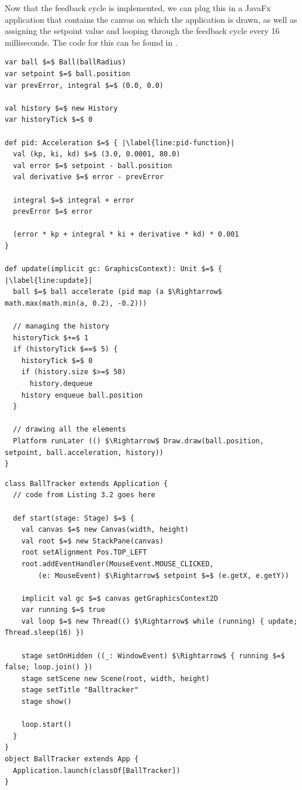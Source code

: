 Now that the feedback cycle is implemented, we can plug this in a JavaFx application that contains the canvas on which the application is drawn, as well as assigning the setpoint value and looping through the feedback cycle every 16 milliseconds. The code for this can be found in .


\begin{minipage}{\linewidth}
\begin{lstlisting}[style=ScalaStyle, caption={Ball drawing}, label={lst:ball-feedback}]
var ball $=$ Ball(ballRadius)
var setpoint $=$ ball.position
var prevError, integral $=$ (0.0, 0.0)

val history $=$ new History
var historyTick $=$ 0

def pid: Acceleration $=$ { |\label{line:pid-function}|
  val (kp, ki, kd) $=$ (3.0, 0.0001, 80.0)
  val error $=$ setpoint - ball.position
  val derivative $=$ error - prevError

  integral $=$ integral + error
  prevError $=$ error

  (error * kp + integral * ki + derivative * kd) * 0.001
}

def update(implicit gc: GraphicsContext): Unit $=$ { |\label{line:update}|
  ball $=$ ball accelerate (pid map (a $\Rightarrow$ math.max(math.min(a, 0.2), -0.2)))

  // managing the history
  historyTick $+=$ 1
  if (historyTick $==$ 5) {
    historyTick $=$ 0
    if (history.size $>=$ 50)
      history.dequeue
    history enqueue ball.position
  }

  // drawing all the elements
  Platform runLater (() $\Rightarrow$ Draw.draw(ball.position, setpoint, ball.acceleration, history))
}
\end{lstlisting}

\begin{lstlisting}[style=ScalaStyle, caption={Ball drawing}, label={lst:ball-drawing}]
class BallTracker extends Application {
  // code from Listing 3.2 goes here

  def start(stage: Stage) $=$ {
    val canvas $=$ new Canvas(width, height)
    val root $=$ new StackPane(canvas)
    root setAlignment Pos.TOP_LEFT
    root.addEventHandler(MouseEvent.MOUSE_CLICKED,
        (e: MouseEvent) $\Rightarrow$ setpoint $=$ (e.getX, e.getY))

    implicit val gc $=$ canvas getGraphicsContext2D
    var running $=$ true
    val loop $=$ new Thread(() $\Rightarrow$ while (running) { update; Thread.sleep(16) })

    stage setOnHidden ((_: WindowEvent) $\Rightarrow$ { running $=$ false; loop.join() })
    stage setScene new Scene(root, width, height)
    stage setTitle "Balltracker"
    stage show()

    loop.start()
  }
}
object BallTracker extends App {
  Application.launch(classOf[BallTracker])
}
\end{lstlisting}
\end{minipage}
